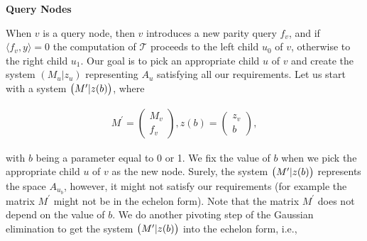 \par\medskip\noindent\textbf{Query Nodes}\par




When $v$ is a query node, then $v$ introduces a new parity query $f_{v}$, and if $\langle f_{v},y\rangle=0$ the computation of $\mathcal{T}$ proceeds to the left child $u_{0}$ of $v$, otherwise to the right child $u_{1}$.
Our goal is to pick an appropriate child $u$ of $v$ and create the system $(M_{u}|z_{u})$ representing $A_{u}$ satisfying all our requirements.
Let us start with a system $\bigl{(}M^{\prime}|z(b)\bigr{)}$, where\par


\[\begin{gathered}
M^{\prime}=\begin{pmatrix}M_{v}\\
f_{v}\end{pmatrix},z(b)=\begin{pmatrix}z_{v}\\
b\end{pmatrix},
\end{gathered}\]


with $b$ being a parameter equal to 0 or 1.
We fix the value of $b$ when we pick the appropriate child $u$ of $v$ as the new node.
Surely, the system $\bigl{(}M^{\prime}|z(b)\bigr{)}$ represents the space $A_{u_{b}}$, however, it might not satisfy our requirements (for example the matrix $M^{\prime}$ might not be in the echelon form).
Note that the matrix $M^{\prime}$ does not depend on the value of $b$.
We do another pivoting step of the Gaussian elimination to get the system $\bigl{(}M^{\prime}|z(b)\bigr{)}$ into the echelon form, i.e.,\par


